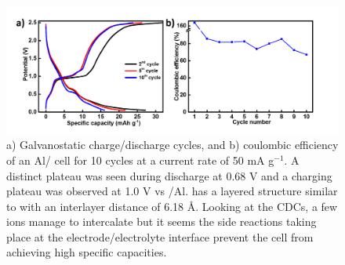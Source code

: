 \begin{figure}[tbh!]
\centering
\includegraphics[width=\textwidth]{Figures/appendix/WS2CDCCE}
\caption{ a) Galvanostatic charge/discharge cycles, and b) coulombic efficiency of an Al/ cell for 10 cycles at a current rate of 50 mA g$^{-1}$. A distinct plateau was seen during discharge at 0.68 V and a charging plateau was observed at 1.0 V vs /Al.  has a layered structure similar to  with an interlayer distance of 6.18 \AA. Looking at the CDCs, a few  ions manage to intercalate but it seems the side reactions taking place at the electrode/electrolyte interface prevent the cell from achieving high specific capacities.}
\label{Figures/appendix:WS2CDCCE}
\end{figure}